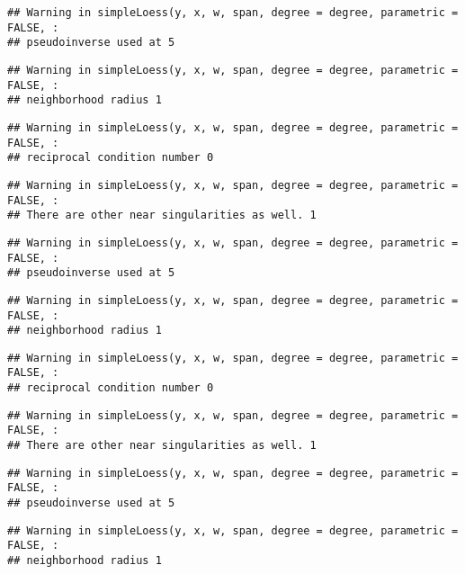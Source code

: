 \documentclass[
]{article}
\begin{document}
\begin{verbatim}
## Warning in simpleLoess(y, x, w, span, degree = degree, parametric = FALSE, :
## pseudoinverse used at 5
\end{verbatim}

\begin{verbatim}
## Warning in simpleLoess(y, x, w, span, degree = degree, parametric = FALSE, :
## neighborhood radius 1
\end{verbatim}

\begin{verbatim}
## Warning in simpleLoess(y, x, w, span, degree = degree, parametric = FALSE, :
## reciprocal condition number 0
\end{verbatim}

\begin{verbatim}
## Warning in simpleLoess(y, x, w, span, degree = degree, parametric = FALSE, :
## There are other near singularities as well. 1
\end{verbatim}

\begin{verbatim}
## Warning in simpleLoess(y, x, w, span, degree = degree, parametric = FALSE, :
## pseudoinverse used at 5
\end{verbatim}

\begin{verbatim}
## Warning in simpleLoess(y, x, w, span, degree = degree, parametric = FALSE, :
## neighborhood radius 1
\end{verbatim}

\begin{verbatim}
## Warning in simpleLoess(y, x, w, span, degree = degree, parametric = FALSE, :
## reciprocal condition number 0
\end{verbatim}

\begin{verbatim}
## Warning in simpleLoess(y, x, w, span, degree = degree, parametric = FALSE, :
## There are other near singularities as well. 1
\end{verbatim}

\begin{verbatim}
## Warning in simpleLoess(y, x, w, span, degree = degree, parametric = FALSE, :
## pseudoinverse used at 5
\end{verbatim}

\begin{verbatim}
## Warning in simpleLoess(y, x, w, span, degree = degree, parametric = FALSE, :
## neighborhood radius 1
\end{verbatim}
\end{document}
